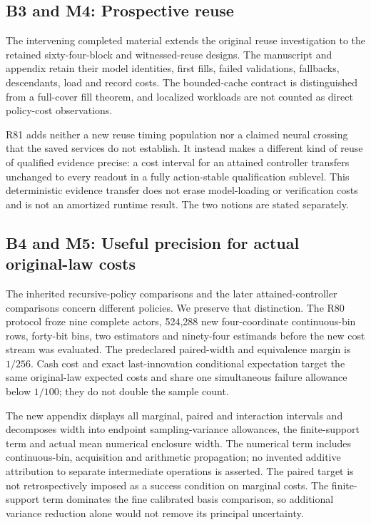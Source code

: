 \hypertarget{b3-and-m4-prospective-reuse}{%
\subsection{B3 and M4: Prospective
reuse}\label{b3-and-m4-prospective-reuse}}

The intervening completed material extends the original reuse
investigation to the retained sixty-four-block and witnessed-reuse
designs. The manuscript and appendix retain their model identities,
first fills, failed validations, fallbacks, descendants, load and record
costs. The bounded-cache contract is distinguished from a full-cover
fill theorem, and localized workloads are not counted as direct
policy-cost observations.

R81 adds neither a new reuse timing population nor a claimed neural
crossing that the saved services do not establish. It instead makes a
different kind of reuse of qualified evidence precise: a cost interval
for an attained controller transfers unchanged to every readout in a
fully action-stable qualification sublevel. This deterministic evidence
transfer does not erase model-loading or verification costs and is not
an amortized runtime result. The two notions are stated separately.

\hypertarget{b4-and-m5-useful-precision-for-actual-original-law-costs}{%
\subsection{B4 and M5: Useful precision for actual original-law
costs}\label{b4-and-m5-useful-precision-for-actual-original-law-costs}}

The inherited recursive-policy comparisons and the later
attained-controller comparisons concern different policies. We preserve
that distinction. The R80 protocol froze nine complete actors, 524,288
new four-coordinate continuous-bin rows, forty-bit bins, two estimators
and ninety-four estimands before the new cost stream was evaluated. The
predeclared paired-width and equivalence margin is \(1/256\). Cash cost
and exact last-innovation conditional expectation target the same
original-law expected costs and share one simultaneous failure allowance
below \(1/100\); they do not double the sample count.

The new appendix displays all marginal, paired and interaction intervals
and decomposes width into endpoint sampling-variance allowances, the
finite-support term and actual mean numerical enclosure width. The
numerical term includes continuous-bin, acquisition and arithmetic
propagation; no invented additive attribution to separate intermediate
operations is asserted. The paired target is not retrospectively imposed
as a success condition on marginal costs. The finite-support term
dominates the fine calibrated basis comparison, so additional variance
reduction alone would not remove its principal uncertainty.

